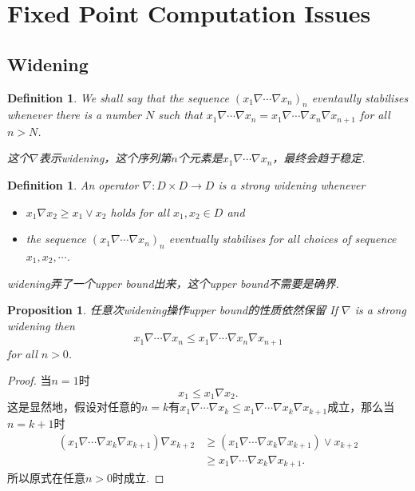 \documentclass{article}
\newtheorem{proposition}[theorem]{Proposition}
\newtheorem{definition}[theorem]{Definition}
\newcommand*{\xfunc}[4]{{#2}\colon{#3}{#1}{#4}}
\newcommand*{\func}[3]{\xfunc{\to}{#1}{#2}{#3}}
\begin{document}
\section{Fixed Point Computation Issues}

\newpage
\subsection{Widening}

\begin{definition}
\rm We shall say that the sequence $(x_1 \nabla \cdots \nabla x_n)_n$ {\color{red} eventaully stabilises} whenever there is a number $N$ such that $x_1 \nabla \cdots \nabla x_n = x_1 \nabla \cdots \nabla x_n \nabla x_{n+1}$ for all $n > N$.

{\color{blue} 这个$\nabla$表示widening，这个序列第$n$个元素是$x_1 \nabla \cdots \nabla x_n$，最终会趋于稳定}.
\end{definition}

\begin{definition}
\rm An operator $\func{\nabla}{D \times D}{D}$ is a {\color{red} strong widening }whenever
\begin{itemize}
	\item $x_1 \nabla x_2 \geq x_1 \vee x_2$ holds for all $x_1,x_2 \in D$ and
	\item the sequence $(x_1 \nabla \cdots \nabla x_n)_n$ eventually stabilises for all choices of sequence $x_1, x_2 ,\cdots$.
\end{itemize}

{\color{blue} widening弄了一个upper bound出来，这个upper bound不需要是确界}.
\end{definition}

\begin{proposition}
\rm {\color{red} 任意次widening操作upper bound的性质依然保留} If $\nabla$ is a strong widening then
$$
x_1 \nabla \cdots \nabla x_n \leq x_1 \nabla \cdots \nabla x_n \nabla x_{n+1}
$$
for all $n > 0$.
\end{proposition}

\begin{proof}
当$n=1$时
$$
x_1 \leq x_1 \nabla x_2.
$$
这是显然地，假设对任意的$n = k$有$x_1 \nabla \cdots \nabla x_k \leq x_1 \nabla \cdots \nabla x_k \nabla x_{k+1}$成立，那么当$n = k+1$时
$$
\begin{aligned}
(x_1 \nabla \cdots \nabla x_k \nabla x_{k+1}) \nabla x_{k+2} &\geq (x_1 \nabla \cdots \nabla x_k \nabla x_{k+1}) \vee x_{k+2} \\
& \geq x_1 \nabla \cdots \nabla x_k \nabla x_{k+1}.
\end{aligned}
$$
所以原式在任意$n >0$时成立.
\end{proof}
\end{document}

